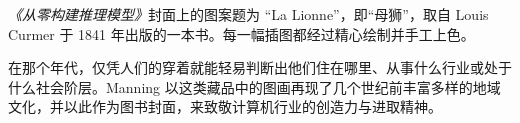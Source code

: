 \emph{《从零构建推理模型》}封面上的图案题为 “La Lionne”，即“母狮”，取自 Louis Curmer 于 1841 年出版的一本书。每一幅插图都经过精心绘制并手工上色。

在那个年代，仅凭人们的穿着就能轻易判断出他们住在哪里、从事什么行业或处于什么社会阶层。Manning 以这类藏品中的图画再现了几个世纪前丰富多样的地域文化，并以此作为图书封面，来致敬计算机行业的创造力与进取精神。
